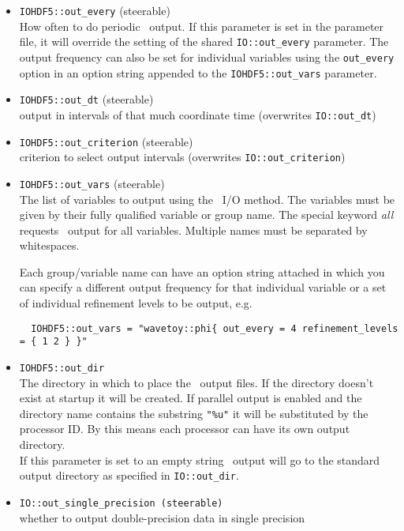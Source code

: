 \documentclass{article}
\begin{document}
\begin{itemize}
  \item {\tt IOHDF5::out\_every} (steerable)\\
        How often to do periodic \ThisThorn\ output. If this parameter is set
        in the parameter file, it will override the setting of the shared
        {\tt IO::out\_every} parameter. The output frequency can also be set
        for individual variables using the {\tt out\_every} option in an option
        string appended to the {\tt IOHDF5::out\_vars} parameter.

  \item {\tt IOHDF5::out\_dt} (steerable)\\
        output in intervals of that much coordinate time (overwrites {\tt IO::out\_dt})

  \item {\tt IOHDF5::out\_criterion} (steerable)\\
        criterion to select output intervals (overwrites {\tt IO::out\_criterion})

  \item {\tt IOHDF5::out\_vars} (steerable)\\
        The list of variables to output using the \ThisThorn\ I/O method.
        The variables must be given by their fully qualified variable or group
        name. The special keyword {\it all} requests \ThisThorn\ output for
        all variables. Multiple names must be separated by whitespaces.

        Each group/variable name can have an option string attached in which you
        can specify a different output frequency for that individual variable
	or a set of individual refinement levels to be output, e.g.
\begin{verbatim}
  IOHDF5::out_vars = "wavetoy::phi{ out_every = 4 refinement_levels = { 1 2 } }"
\end{verbatim}

  \item {\tt IOHDF5::out\_dir}\\
        The directory in which to place the \ThisThorn\ output files.
        If the directory doesn't exist at startup it will be created.
        If parallel output is enabled and the directory name contains the
        substring {\tt "\%u"} it will be substituted by the processor ID.
        By this means each processor can have its own output directory.\\
        If this parameter is set to an empty string \ThisThorn\ output will go
        to the standard output directory as specified in {\tt IO::out\_dir}.

  \item {\tt IO::out\_single\_precision (steerable)}\\
        whether to output double-precision data in single precision

\end{itemize}
\end{document}
